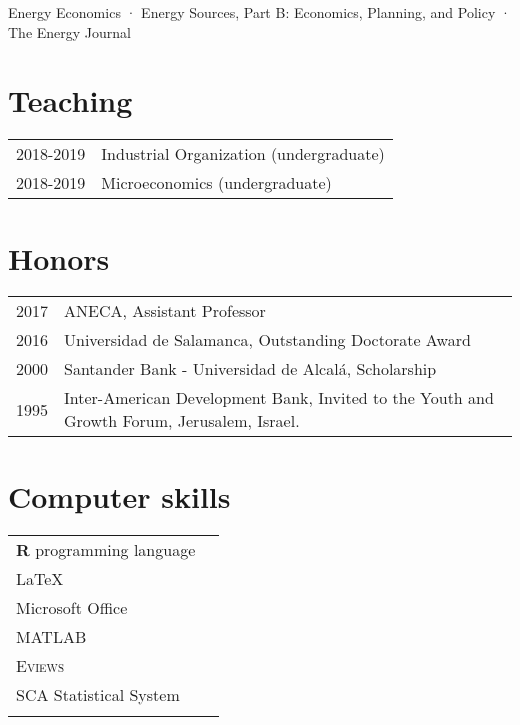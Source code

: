\documentclass[11pt]{article}\usepackage[]{graphicx}\usepackage[]{color}
\begin{document}
\raggedright
Energy Economics · Energy Sources, Part B: Economics, Planning, and Policy · The Energy Journal


\section{Teaching} 

\begin{tabular}{R{2cm} | L{12cm}}

2018-2019 & Industrial Organization (undergraduate)\\

2018-2019 & Microeconomics (undergraduate)\\

\end{tabular}


\section{Honors} 

\begin{tabular}{R{2cm} | L{12cm}}

2017 & ANECA, Assistant Professor\\

2016 & Universidad de Salamanca, Outstanding Doctorate Award\\

2000	& Santander Bank - Universidad de Alcalá, Scholarship\\

1995 & Inter-American Development Bank, Invited to the Youth and Growth Forum, Jerusalem, Israel.\\

\end{tabular}


\section{Computer skills} 

\begin{tabular}{ll}
\textbf{\textsf{R}} programming language\\
{\LaTeX}\\
Microsoft Office\\
\textsc{MATLAB}\\
\textsc{Eviews}\\
SCA Statistical System\\
&
\end{tabular}
\end{document}
